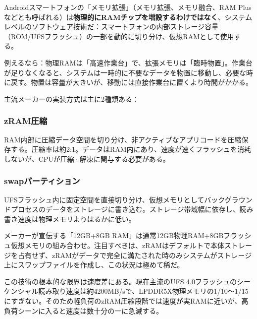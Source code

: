 


Androidスマートフォンの「メモリ拡張」（メモリ拡張、メモリ融合、RAM Plusなどとも呼ばれる）は\textbf{物理的にRAMチップを増設するわけではなく}、システムレベルのソフトウェア技術だ：スマートフォンの内部ストレージ容量（ROM/UFSフラッシュ）の一部を動的に切り分け、仮想RAMとして使用する。

例えるなら：物理RAMは「高速作業台」で、拡張メモリは「臨時物置」。作業台が足りなくなると、システムは一時的に不要なデータを物置に移動し、必要な時に戻す。物置は容量が大きいが、移動には直接作業台に置くより時間がかかる。


主流メーカーの実装方式は主に2種類ある：

\subsubsection*{zRAM圧縮}

RAM内部に圧縮データ空間を切り分け、非アクティブなアプリコードを圧縮保存する。圧縮率は約2:1。データはRAM内にあり、速度が速くフラッシュを消耗しないが、CPUが圧縮·解凍に関与する必要がある。

\subsubsection*{swapパーティション}

UFSフラッシュ内に固定空間を直接切り分け、仮想メモリとしてバックグラウンドプロセスのデータをストレージに書き込む。ストレージ帯域幅に依存し、読み書き速度は物理メモリよりはるかに低い。

メーカーが宣伝する「12GB+8GB RAM」は通常12GB物理RAM+8GBフラッシュ仮想メモリの組み合わせ。注目すべきは、zRAMはデフォルトで本体ストレージを占有せず、zRAMがデータで完全に満たされた時のみシステムがストレージ上にスワップファイルを作成し、この状況は極めて稀だ。


この技術の根本的な限界は速度差にある。現在主流のUFS 4.0フラッシュのシーケンシャル読み取り速度は約4200MB/sで、LPDDR5X物理メモリの1/10〜1/15にすぎない。そのため軽負荷のzRAM圧縮段階では速度が実RAMに近いが、高負荷シーンに入ると速度は数十分の一に急減する。

